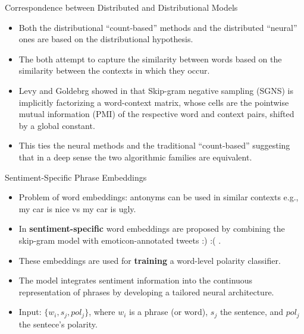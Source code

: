 \begin{frame}{Correspondence between Distributed and Distributional Models}
\begin{scriptsize}
\begin{itemize}
       
\item Both the distributional ``count-based'' methods and the distributed ``neural'' ones are based on the distributional hypothesis.

\item The both attempt to capture the similarity between words based on the similarity between the contexts in which they occur.      
       
\item Levy and Goldebrg showed in \cite{levy2014neural} that Skip-gram negative sampling (SGNS) is implicitly factorizing a word-context matrix, whose cells are the pointwise mutual information (PMI) of the respective word and context pairs, shifted by a global constant. 


\item This ties the neural methods and the traditional ``count-based'' suggesting that in a deep sense
the two algorithmic families are equivalent.
     
\end{itemize}
\end{scriptsize}
\end{frame}

\begin{frame}{Sentiment-Specific Phrase Embeddings}
\begin{scriptsize}
\begin{itemize}
\item Problem of word embeddings: antonyms can be used in similar contexts e.g., my car is nice vs my car is ugly.

\item In \cite{TangCol14}  \textbf{sentiment-specific} word embeddings are proposed  by combining the skip-gram model with emoticon-annotated tweets :) :( .

\item These embeddings are used for \textbf{training} a word-level polarity classifier.

\item The model integrates sentiment information into the continuous representation of phrases by developing a tailored neural architecture.

\item Input: $\{w_i,s_j,pol_j\}$, where $w_i$ is a phrase (or word), $s_j$ the sentence, and $pol_j$ the sentece's polarity.

\end{itemize}
\end{scriptsize}
\end{frame}


